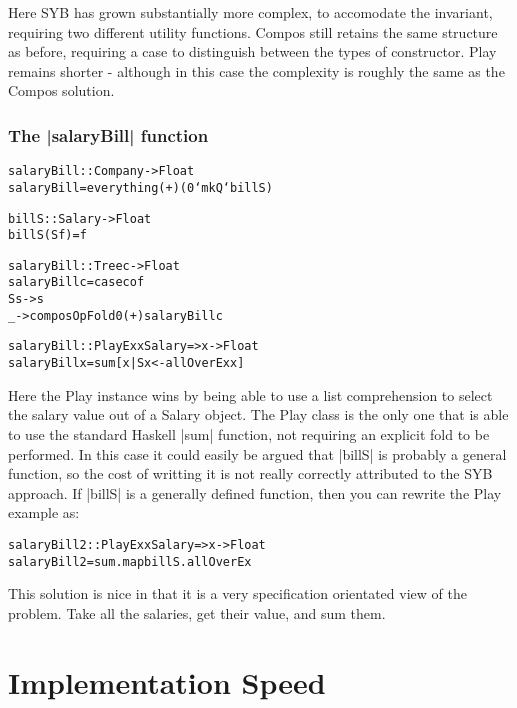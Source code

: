 \documentclass[preprint]{sigplanconf}
\newenvironment{code}{\begin{alltt}\small}{\end{alltt}}
\begin{document}
    Here SYB has grown substantially more complex, to accomodate the invariant, requiring two different utility functions. Compos still retains the same structure as before, requiring a case to distinguish between the types of constructor. Play remains shorter - although in this case the complexity is roughly the same as the Compos solution.


\subsubsection{The |salaryBill| function}

\begin{code} %
salaryBill :: Company -> Float
salaryBill = everything (+) (0 `mkQ` billS)

billS :: Salary -> Float
billS (S f) = f
\end{code}
\begin{code} %
salaryBill :: Tree c -> Float
salaryBill c = case c of
    S s -> s
    _ -> composOpFold 0 (+) salaryBill c
\end{code}
\begin{code} %
salaryBill :: PlayEx x Salary => x -> Float
salaryBill x = sum [x | S x <- allOverEx x]
\end{code}

    Here the Play instance wins by being able to use a list comprehension to select the salary value out of a Salary object. The Play class is the only one that is able to use the standard Haskell |sum| function, not requiring an explicit fold to be performed. In this case it could easily be argued that |billS| is probably a general function, so the cost of writting it is not really correctly attributed to the SYB approach. If |billS| is a generally defined function, then you can rewrite the Play example as:

\begin{code} %
salaryBill2 :: PlayEx x Salary => x -> Float
salaryBill2 = sum . map billS . allOverEx
\end{code}

    This solution is nice in that it is a very specification orientated view of the problem. Take all the salaries, get their value, and sum them.



\section{Implementation Speed}
\end{document}
